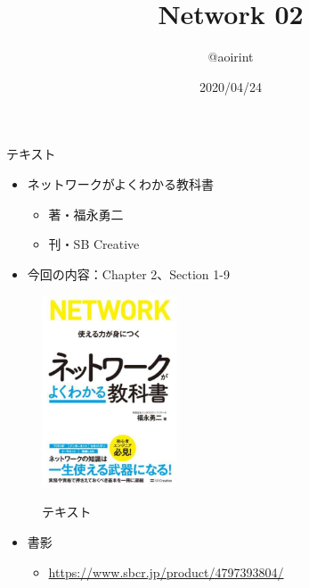 \documentclass[12pt,aspectratio=169]{beamer}
\title{Network 02}
\author{@aoirint}
\date{2020/04/24}
\begin{document}
\frame{\maketitle}

\begin{frame}{テキスト}

  \begin{minipage}{0.58\textwidth}
    \begin{itemize}
      \item ネットワークがよくわかる教科書
      \begin{itemize}
        \item 著・福永勇二
        \item 刊・SB Creative
      \end{itemize}
      \item 今回の内容：Chapter 2、Section 1-9
    \end{itemize}
  \end{minipage}
  \hfill
  \begin{minipage}{0.38\textwidth}
    \vspace{-1\baselineskip}
    \begin{figure}[h]
      \centering
      \includegraphics[width=4cm,bb=0 0 420 596]{./figures/networkbook.jpg}
      \label{fig:networkbook}
      \caption{テキスト}
    \end{figure}
  \end{minipage}

  \begin{itemize}
    \item 書影
    \begin{itemize}
      \item { \small \url{https://www.sbcr.jp/product/4797393804/} }
    \end{itemize}
  \end{itemize}

\end{frame}
\end{document}
